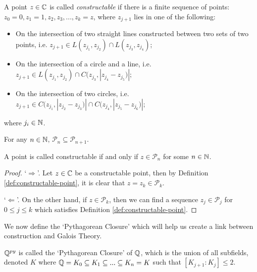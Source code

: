 \begin{definition}\label{def:constructable-point}
    A point $z \in \mathbb C$ is called \textit{constructable} if there is a finite sequence of points:
    $z_0=0,z_1=1,z_2,z_3,...,z_k=z$, where $z_{j+1}$ lies in one of the following:
    \begin{itemize}
        \item On the intersection of two straight lines constructed between two sets of two points, i.e.
        $z_{j+1}\in L(z_{j_1},z_{j_2})\cap L(z_{j_3},z_{j_4})$;
        \item On the intersection of a circle and a line, i.e.
        $z_{j+1}\in L(z_{j_1},z_{j_2})\cap C(z_{j_3},|z_{j_4}-z_{j_5})|$;
        \item On the intersection of two circles, i.e.
        $z_{j+1}\in C(z_{j_1},|z_{j_2}-z_{j_3})|\cap C(z_{j_4},|z_{j_5}-z_{j_6})|$;
    \end{itemize}
    where $j_i\in \mathbb N$.
\end{definition}

\begin{lemma}\label{thm:point-subset}
    For any $n \in \mathbb N$, 
    $\mathcal{P}_n \subseteq \mathcal{P}_{n+1}$. 
\end{lemma}


\begin{theorem}
    A point is called constructable if and only if $z\in \mathcal{P}_n$ for some $n\in \mathbb N$. 
\end{theorem}

\begin{proof}  
    `$\Longrightarrow$'. Let $z \in \mathbb C$ be a constructable point, then by Definition \ref{def:constructable-point}, it is clear that $z=z_k\in \mathcal{P}_k$.
    
    `$\Longleftarrow$'. On the other hand, if $z \in \mathcal{P}_k$, then we can find a sequence $z_j \in \mathcal{P}_j$ for $0\leq j \leq k$ which satisfies Definition \ref{def:constructable-point}.
\end{proof}

We now define the `Pythagorean Closure' which will help us create a link between construction and Galois Theory.

\begin{definition}
    $\mathbb Q^{py}$ is called the `Pythagorean Closure' of $\mathbb Q$, which is the union of all subfields, denoted $K$ where
    $\mathbb Q = K_0 \subseteq K_1 \subseteq ... \subseteq K_n=K$ such that $[K_{j+1}:K_j]\leq 2$.
\end{definition}

